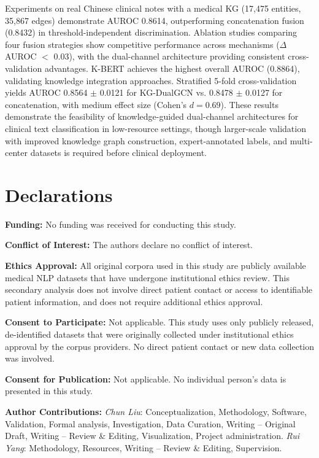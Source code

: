 \documentclass[11pt,onecolumn,a4paper]{article}
\begin{document}
Experiments on real Chinese clinical notes with a medical KG (17,475 entities, 35,867 edges) demonstrate AUROC 0.8614, outperforming concatenation fusion (0.8432) in threshold-independent discrimination. Ablation studies comparing four fusion strategies show competitive performance across mechanisms ($\Delta$AUROC $<$ 0.03), with the dual-channel architecture providing consistent cross-validation advantages. K-BERT achieves the highest overall AUROC (0.8864), validating knowledge integration approaches. Stratified 5-fold cross-validation yields AUROC 0.8564 $\pm$ 0.0121 for KG-DualGCN vs. 0.8478 $\pm$ 0.0127 for concatenation, with medium effect size (Cohen's $d = 0.69$). These results demonstrate the feasibility of knowledge-guided dual-channel architectures for clinical text classification in low-resource settings, though larger-scale validation with improved knowledge graph construction, expert-annotated labels, and multi-center datasets is required before clinical deployment.

\section*{Declarations}

\textbf{Funding:} No funding was received for conducting this study.

\textbf{Conflict of Interest:} The authors declare no conflict of interest.

\textbf{Ethics Approval:} All original corpora used in this study are publicly available medical NLP datasets that have undergone institutional ethics review. This secondary analysis does not involve direct patient contact or access to identifiable patient information, and does not require additional ethics approval.

\textbf{Consent to Participate:} Not applicable. This study uses only publicly released, de-identified datasets that were originally collected under institutional ethics approval by the corpus providers. No direct patient contact or new data collection was involved.

\textbf{Consent for Publication:} Not applicable. No individual person's data is presented in this study.

\textbf{Author Contributions:} \textit{Chun Liu}: Conceptualization, Methodology, Software, Validation, Formal analysis, Investigation, Data Curation, Writing -- Original Draft, Writing -- Review \& Editing, Visualization, Project administration. \textit{Rui Yang}: Methodology, Resources, Writing -- Review \& Editing, Supervision.
\end{document}
